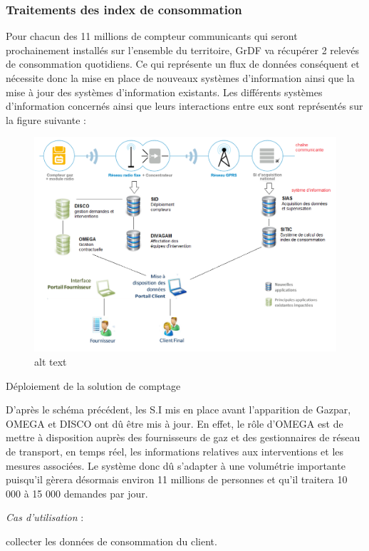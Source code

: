 \documentclass[
12pt,
french,                           %
a4paper,
]{article}
\begin{document}
\subsubsection{Traitements des index de consommation}

Pour chacun des 11 millions de compteur communicants qui seront
prochainement installés sur l'ensemble du territoire, GrDF va récupérer
2 relevés de consommation quotidiens. Ce qui représente un flux de
données conséquent et nécessite donc la mise en place de nouveaux
systèmes d'information ainsi que la mise à jour des systèmes
d'information existants. Les différents systèmes d'information concernés
ainsi que leurs interactions entre eux sont représentés sur la figure
suivante :

\begin{figure}[htbp]
\centering
\includegraphics{sigazpar.png}
\caption{alt text}
\end{figure}

Déploiement de la solution de comptage

D'après le schéma précédent, les S.I mis en place avant l'apparition de
Gazpar, OMEGA et DISCO ont dû être mis à jour. En effet, le rôle d'OMEGA
est de mettre à disposition auprès des fournisseurs de gaz et des
gestionnaires de réseau de transport, en temps réel, les informations
relatives aux interventions et les mesures associées. Le système donc dû
s'adapter à une volumétrie importante puisqu'il gèrera désormais environ
11 millions de personnes et qu'il traitera 10 000 à 15 000 demandes par
jour.

\emph{Cas d'utilisation} :

collecter les données de consommation du client.
\end{document}
